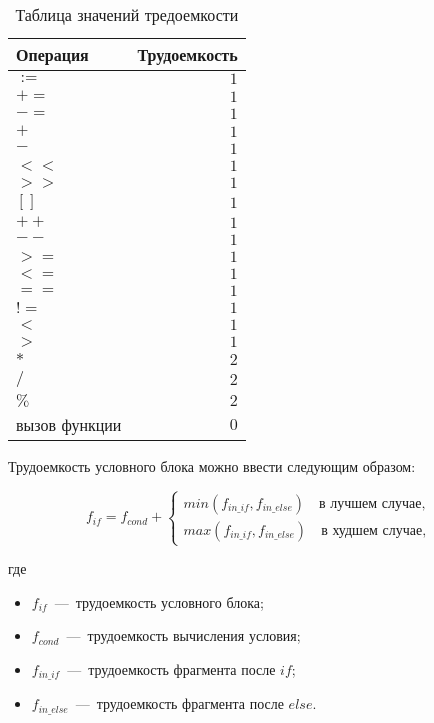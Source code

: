 \begin{table}[h]
  \caption{\label{table:complexity} Таблица значений тредоемкости}
  \begin{center}
    \begin{tabular}{|l|r|}
      \hline
      Операция & Трудоемкость\\ \hline
      $:=$ & $1$ \\ \hline
      $+=$ & $1$ \\ \hline
      $-=$ & $1$ \\ \hline
      $+$ & $1$ \\ \hline
      $-$ & $1$ \\ \hline
      $<<$ & $1$ \\ \hline
      $>>$ & $1$ \\ \hline
      $[]$ & $1$ \\ \hline
      $++$ & $1$ \\ \hline
      $--$ & $1$ \\ \hline
      $>=$ & $1$ \\ \hline
      $<=$ & $1$ \\ \hline
      $==$ & $1$ \\ \hline
      $!=$ & $1$ \\ \hline
      $<$ & $1$ \\ \hline
      $>$ & $1$ \\ \hline
      $*$ & $2$ \\ \hline
      $/$ & $2$ \\ \hline
      $\%$ & $2$ \\ \hline
      вызов функции & $0$ \\ \hline
    \end{tabular}
  \end{center}
\end{table}

Трудоемкость условного блока можно ввести следующим образом:

\begin{equation}
	f_{if} = f_{cond} + \begin{cases}
		min(f_{in\_if}, f_{in\_else}) \quad \text{в лучшем случае}, \\
		max(f_{in\_if}, f_{in\_else}) \quad \text{в худшем случае},
	\end{cases}
\end{equation}

где

\begin{itemize}
	\item $f_{if}$~---~трудоемкость условного блока;
	\item $f_{cond}$~---~трудоемкость вычисления условия;
	\item $f_{in\_if}$~---~трудоемкость фрагмента после $if$;
	\item $f_{in\_else}$~---~трудоемкость фрагмента после $else$.
\end{itemize}

